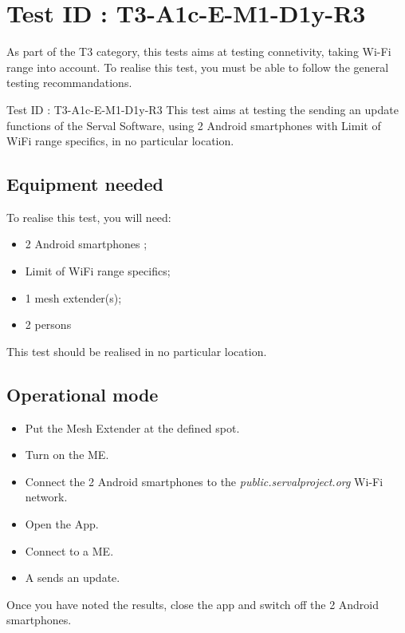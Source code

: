 \documentclass[oneside]{book}
\begin{document}
\section{Test ID : T3-A1c-E-M1-D1y-R3}
\begin{itshape}
As part of the T3 category, this tests aims at testing connetivity, taking Wi-Fi range into account.
To realise this test, you must be able to follow the general testing recommandations.
\end{itshape}
\newline
Test ID : T3-A1c-E-M1-D1y-R3
 This test aims at testing the sending an update functions of the Serval Software, using 2 Android smartphones with Limit of WiFi range specifics, in no particular location.
\subsection{Equipment needed} To realise this test, you will need:
\begin{itemize}
\item 2 Android smartphones ;
\item Limit of WiFi range specifics;
\item 1 mesh extender(s);
\item 2 persons
\end{itemize}
This test should be realised in no particular location.
\subsection{Operational mode} \begin{itemize}
\item Put the Mesh Extender at the defined spot.
\item Turn on the ME.
\item Connect the 2 Android smartphones to the \emph{public.servalproject.org} Wi-Fi network.
\item Open the App.
\item Connect to a ME.
\item A sends an update.
\end{itemize}
Once you have noted the results, close the app and switch off the 2 Android smartphones.
\end{document}

